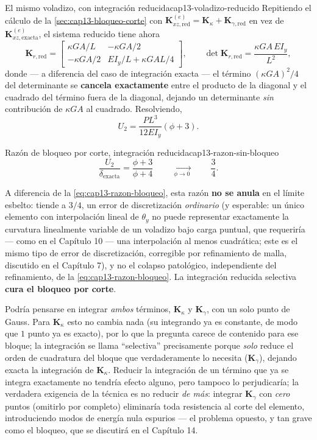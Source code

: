 \begin{ejemplo}{El mismo voladizo, con integración reducida}{cap13-voladizo-reducido}
Repitiendo el cálculo de la \cref{sec:cap13-bloqueo-corte} con $\bm K^{(e)}_{xz,\text{red}}=\bm K_\kappa+\bm K_{\gamma,\text{red}}$ en vez de $\bm K^{(e)}_{xz,\text{exacta}}$, el sistema reducido tiene ahora
\[
\bm K_{r,\text{red}} = \begin{bmatrix}\kappa GA/L & -\kappa GA/2 \\ -\kappa GA/2 & EI_y/L+\kappa GAL/4\end{bmatrix}, \qquad
\det\bm K_{r,\text{red}} = \frac{\kappa GA\,EI_y}{L^2} ,
\]
donde --- a diferencia del caso de integración exacta --- el término $(\kappa GA)^2/4$ del determinante se \textbf{cancela exactamente} entre el producto de la diagonal y el cuadrado del término fuera de la diagonal, dejando un determinante \emph{sin} contribución de $\kappa GA$ al cuadrado. Resolviendo,
\[
U_2 = \frac{PL^3}{12EI_y}\left(\phi+3\right) .
\]

\begin{ecnimportante}{Razón de bloqueo por corte, integración reducida}{cap13-razon-sin-bloqueo}
\[
\frac{U_2}{\delta_{\text{exacta}}} = \frac{\phi+3}{\phi+4} \qquad\xrightarrow[\ \phi\to0\ ]{}\qquad \frac34 .
\]
\end{ecnimportante}

A diferencia de la \cref{eq:cap13-razon-bloqueo}, esta razón \textbf{no se anula} en el límite esbelto: tiende a $3/4$, un error de discretización \emph{ordinario} (y esperable: un único elemento con interpolación lineal de $\theta_y$ no puede representar exactamente la curvatura linealmente variable de un voladizo bajo carga puntual, que requeriría --- como en el Capítulo 10 --- una interpolación al menos cuadrática; este es el mismo tipo de error de discretización, corregible por refinamiento de malla, discutido en el Capítulo 7), y no el colapso patológico, independiente del refinamiento, de la \cref{eq:cap13-razon-bloqueo}. La integración reducida selectiva \textbf{cura el bloqueo por corte}.
\end{ejemplo}

\begin{observacion}
Podría pensarse en integrar \emph{ambos} términos, $\bm K_\kappa$ y $\bm K_\gamma$, con un solo punto de Gauss. Para $\bm K_\kappa$ esto no cambia nada (su integrando ya es constante, de modo que $1$ punto ya es exacto), por lo que la pregunta carece de contenido para ese bloque; la integración se llama ``selectiva'' precisamente porque \emph{solo} reduce el orden de cuadratura del bloque que verdaderamente lo necesita ($\bm K_\gamma$), dejando exacta la integración de $\bm K_\kappa$. Reducir la integración de un término que ya se integra exactamente no tendría efecto alguno, pero tampoco lo perjudicaría; la verdadera exigencia de la técnica es no reducir \emph{de más}: integrar $\bm K_\gamma$ con \emph{cero} puntos (omitirlo por completo) eliminaría toda resistencia al corte del elemento, introduciendo modos de energía nula espurios --- el problema opuesto, y tan grave como el bloqueo, que se discutirá en el Capítulo 14.
\end{observacion}

